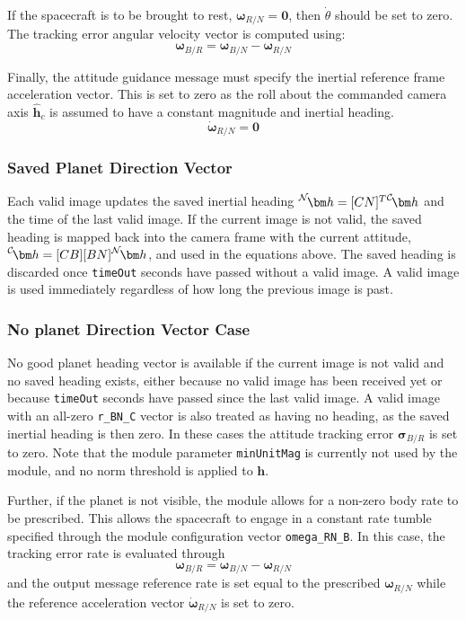 If the spacecraft is to be brought to rest, $\bm\omega_{R/N} = \bm 0$, then $\dot\theta$ should be set to zero.  The tracking error angular velocity vector is computed using:
\begin{equation}
	\label{eq:ssp:4}
	\bm\omega_{B/R} = \bm\omega_{B/N} - \bm\omega_{R/N}
\end{equation}

Finally, the attitude guidance message must specify the inertial reference frame  acceleration vector.  This is set to zero as the roll about the commanded camera axis $\hat{\bm h}_{c}$ is assumed to have a constant magnitude and inertial heading.
\begin{equation}
	\dot{\bm \omega}_{R/N} = \bm 0
\end{equation}

\subsubsection{Saved Planet Direction Vector}
Each valid image updates the saved inertial heading $\leftexp{N}{\bm h} = [CN]^{T}\leftexp{C}{\bm h}$ and the time of the last valid image.  If the current image is not valid, the saved heading is mapped back into the camera frame with the current attitude, $\leftexp{C}{\bm h} = [CB][BN]\leftexp{N}{\bm h}$, and used in the equations above.  The saved heading is discarded once {\tt timeOut} seconds have passed without a valid image.  A valid image is used immediately regardless of how long the previous image is past.

\subsubsection{No planet Direction Vector Case}
 No good planet heading vector is available if the current image is not valid and no saved heading exists, either because no valid image has been received yet or because {\tt timeOut} seconds have passed since the last valid image.  A valid image with an all-zero {\tt r\_BN\_C} vector is also treated as having no heading, as the saved inertial heading is then zero.  In these cases the attitude tracking error $\bm\sigma_{B/R}$ is set to zero.  Note that the module parameter {\tt minUnitMag} is currently not used by the module, and no norm threshold is applied to $\bm h$.

 Further, if the planet is not visible, the module allows for a non-zero body rate to be prescribed.  This allows the spacecraft to engage in a constant rate tumble specified through the module configuration vector {\tt omega\_RN\_B}.  In this case, the tracking error rate is evaluated through
 \begin{equation}
 	\label{eq:ssp:6}
	\bm\omega_{B/R} = \bm\omega_{B/N} - \bm\omega_{R/N}
 \end{equation}
 and the output message reference rate is set equal to the prescribed $\bm\omega_{R/N}$ while the reference acceleration vector $\dot{\bm \omega}_{R/N}$ is set to zero.


